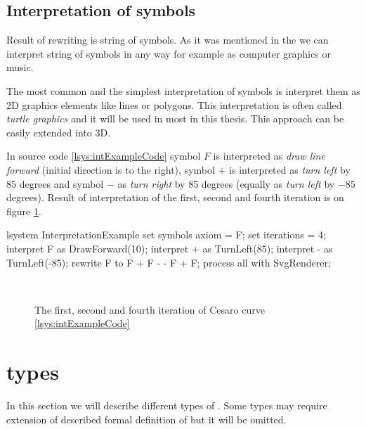 \subsection{Interpretation of \lsystem symbols}

Result of \lsystem rewriting is string of symbols.
As it was mentioned in the  we can interpret string of symbols in any way for example as computer graphics or music.

The most common and the simplest interpretation of \lsystem symbols is interpret them as 2D graphics elements like lines or polygons.
This interpretation is often called \emph{turtle graphics} and it will be used in most \lsystems in this thesis.
This approach can be easily extended into 3D.

In source code \ref{lsys:intExampleCode} symbol $F$ is interpreted as \emph{draw line forward} (initial direction is to the right), symbol $+$ is interpreted as \emph{turn left} by 85 degrees and symbol $-$ as \emph{turn right} by 85 degrees (equally as \emph{turn left} by $-85$ degrees).
Result of interpretation of the first, second and fourth iteration is on figure \ref{fig:intExample}.

\begin{Lsystem}[label=lsys:intExampleCode,caption={Symbol interpretation example}]
lsystem InterpretationExample {
	set symbols axiom = F;
	set iterations = 4;
	interpret F as DrawForward(10);
	interpret + as TurnLeft(85);
	interpret - as TurnLeft(-85);
	rewrite F to F + F - - F + F;
}
process all with SvgRenderer;
\end{Lsystem}

\begin{figure}[ht]
	\centering
	 ~
	 ~
	\caption{The first, second and fourth iteration of Cesaro curve \lsystem \ref{lsys:intExampleCode}}
	\label{fig:intExample}
\end{figure}


\section{\lsystem types}

In this section we will describe different types of \lsystems.
Some types may require extension of described formal definition of \lsystem but it will be omitted.

